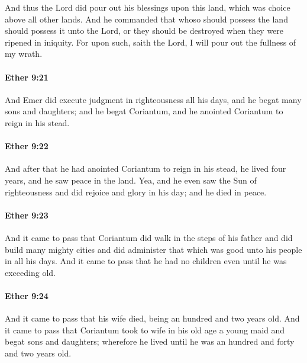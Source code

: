 			And thus the Lord did pour out his blessings upon this land,
			which was choice above all other lands.
			And he commanded that whoso should possess the land
			should possess it unto the Lord,
			or they should be destroyed when they were ripened in iniquity.
			For upon such, saith the Lord, I will pour out the fullness of my wrath.

		\paragraph{Ether 9:21} %
			\label{ETHER-9-21}

			And Emer did execute judgment in righteousness all his days,
			and he begat many sons and daughters;
			and he begat Coriantum,
			and he anointed Coriantum to reign in his stead.

		\paragraph{Ether 9:22} %
			\label{ETHER-9-22}

			And after that he had anointed Coriantum to reign in his stead,
			he lived four years, and he saw peace in the land.
			Yea, and he even saw the Sun of righteousness
			and did rejoice and glory in his day;
			and he died in peace.

		\paragraph{Ether 9:23} %
			\label{ETHER-9-23}

			And it came to pass that Coriantum did walk in the steps of his father
			and did build many mighty cities
			and did administer that which was good unto his people in all his days.
			And it came to pass that he had no children even until he was exceeding old.

		\paragraph{Ether 9:24} %
			\label{ETHER-9-24}

			And it came to pass that his wife died,
			being an hundred and two years old.
			And it came to pass that Coriantum took to wife in his old age a young maid
			and begat sons and daughters;
			wherefore he lived until he was an hundred and forty and two years old.

